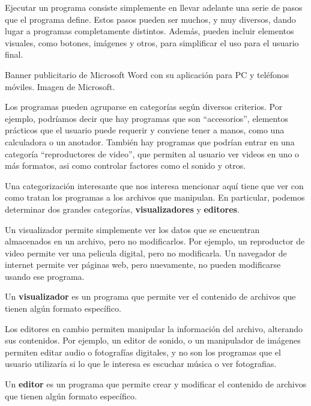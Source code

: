 Ejecutar un programa consiste simplemente en llevar adelante una serie de pasos
que el programa define. Estos pasos pueden ser muchos, y muy diversos, dando lugar
a programas completamente distintos. Además, pueden incluir elementos visuales, como
botones, imágenes y otros, para simplificar el uso para el usuario final.

{Banner publicitario de Microsoft Word con su aplicación para PC y teléfonos móviles.}
{Imagen de Microsoft.}

Los programas pueden agruparse en categorías según diversos criterios. Por ejemplo,
podríamos decir que hay programas que son ``accesorios'', elementos prácticos que
el usuario puede requerir y conviene tener a manos, como una calculadora o un anotador.
También hay programas que podrían entrar en una categoría ``reproductores de video'',
que permiten al usuario ver videos en uno o más formatos, asi como controlar
factores como el sonido y otros.

Una categorización interesante que nos interesa mencionar aquí tiene que ver con
como tratan los programas a los archivos que manipulan. En particular, podemos
determinar dos grandes categorías, \textbf{visualizadores} y \textbf{editores}.

Un visualizador permite simplemente ver los datos que se encuentran almacenados
en un archivo, pero no modificarlos. Por ejemplo, un reproductor de video permite
ver una pelicula digital, pero no modificarla. Un navegador de internet permite
ver páginas web, pero nuevamente, no pueden modificarse usando ese programa.

\begin{definition}
    Un \textbf{visualizador} es un programa que permite ver el contenido de
    archivos que tienen algún formato específico.
\end{definition}

Los editores en cambio permiten manipular la información del archivo, alterando
sus contenidos. Por ejemplo, un editor de sonido, o un manipulador de imágenes
permiten editar audio o fotografías digitales, y no son los programas que el
usuario utilizaría si lo que le interesa es escuchar música o ver fotografias.

\begin{definition}
    Un \textbf{editor} es un programa que permite crear y modificar el contenido
    de archivos que tienen algún formato específico.
\end{definition}

